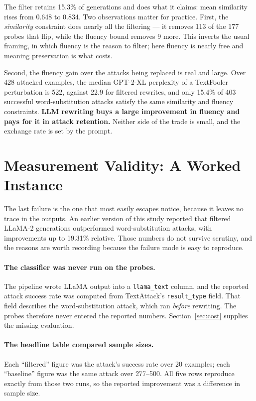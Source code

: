 \documentclass[11pt]{article}
\begin{document}
The filter retains 15.3\% of generations and does what it claims: mean similarity
rises from 0.648 to 0.834. Two observations matter for practice. First, the
\emph{similarity} constraint does nearly all the filtering --- it removes 113 of
the 177 probes that flip, while the fluency bound removes 9 more. This inverts
the usual framing, in which fluency is the reason to filter; here fluency is
nearly free and meaning preservation is what costs.

Second, the fluency gain over the attacks being replaced is real and large. Over
428 attacked examples, the median GPT-2-XL perplexity of a TextFooler
perturbation is 522, against 22.9 for filtered rewrites, and only 15.4\% of 403
successful word-substitution attacks satisfy the same similarity and fluency
constraints. \textbf{LLM rewriting buys a large improvement in fluency and pays
for it in attack retention.} Neither side of the trade is small, and the exchange
rate is set by the prompt.

\section{Measurement Validity: A Worked Instance}
\label{sec:measurement}

The last failure is the one that most easily escapes notice, because it leaves no
trace in the outputs. An earlier version of this study reported that filtered
LLaMA-2 generations outperformed word-substitution attacks, with improvements up
to 19.31\% relative. Those numbers do not survive scrutiny, and the reasons are
worth recording because the failure mode is easy to reproduce.

\paragraph{The classifier was never run on the probes.}
The pipeline wrote LLaMA output into a \texttt{llama\_text} column, and the
reported attack success rate was computed from TextAttack's
\texttt{result\_type} field. That field describes the word-substitution attack,
which ran \emph{before} rewriting. The probes therefore never entered the reported
numbers. Section~\ref{sec:cost} supplies the missing evaluation.

\paragraph{The headline table compared sample sizes.}
Each ``filtered'' figure was the attack's success rate over 20 examples; each
``baseline'' figure was the same attack over 277--500. All five rows reproduce
exactly from those two runs, so the reported improvement was a difference in
sample size.
\end{document}
